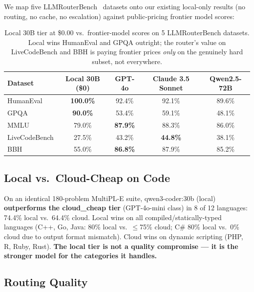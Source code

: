 \documentclass[11pt]{article}
\begin{document}
We map five LLMRouterBench~\cite{gu2025llmrouterbench} datasets onto our
existing local-only results (no routing, no cache, no escalation) against
public-pricing frontier model scores:

\begin{table}[t]
\centering
\small
\begin{tabular}{lcccc}
\toprule
\textbf{Dataset} & \textbf{Local 30B (\$0)} & \textbf{GPT-4o} & \textbf{Claude 3.5 Sonnet} & \textbf{Qwen2.5-72B} \\
\midrule
HumanEval & \textbf{100.0\%} & 92.4\% & 92.1\% & 89.6\% \\
GPQA & \textbf{90.0\%} & 53.4\% & 59.1\% & 48.1\% \\
MMLU & 79.0\% & \textbf{87.9\%} & 88.3\% & 86.0\% \\
LiveCodeBench & 27.5\% & 43.2\% & \textbf{44.8\%} & 38.1\% \\
BBH & 55.0\% & \textbf{86.8\%} & 87.9\% & 85.2\% \\
\bottomrule
\end{tabular}
\caption{Local 30B tier at \$0.00 vs.\ frontier-model scores on 5 LLMRouterBench datasets. Local wins HumanEval and GPQA outright; the router's value on LiveCodeBench and BBH is paying frontier prices \emph{only} on the genuinely hard subset, not everywhere.}
\label{tab:headtohead}
\end{table}

\subsection{Local vs.\ Cloud-Cheap on Code}

On an identical 180-problem MultiPL-E suite, qwen3-coder:30b (local)
\textbf{outperforms the cloud\_cheap tier} (GPT-4o-mini class) in 8 of
12 languages: 74.4\% local vs.\ 64.4\% cloud. Local wins on all
compiled/statically-typed languages (C++, Go, Java: 80\% local vs.\
$\leq$75\% cloud; C\# 80\% local vs.\ 0\% cloud due to output format
mismatch). Cloud wins on dynamic scripting (PHP, R, Ruby, Rust).
\textbf{The local tier is not a quality compromise --- it is the
stronger model for the categories it handles.}

\subsection{Routing Quality}
\end{document}
